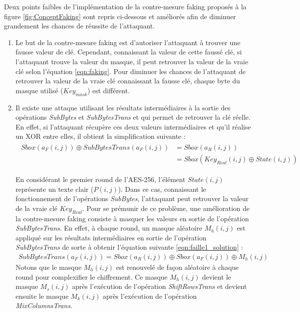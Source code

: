 \documentclass[oneside]{book}
\begin{document}
Deux points faibles \cite{lumbiarres-lopez_faking_2018} de l'implémentation de la contre-mesure faking proposés à la figure \ref{fig:ConceptFaking} sont repris ci-dessous et améliorés afin de diminuer grandement les chances de réussite de l'attaquant.
\begin{enumerate}
\item Le but de la contre-mesure faking est d'autoriser l'attaquant à trouver une fausse valeur de clé. Cependant, connaissant la valeur de cette faussé clé, si l'attaquant trouve la valeur du masque, il peut retrouver la valeur de la vraie clé selon l'équation \ref{eqn:faking}. Pour diminuer les chances de l'attaquant de retrouver la valeur de la vraie clé connaissant la fausse clé, chaque byte du masque utilisé ($Key_{mask}$) est différent.
\item Il existe une attaque utilisant les résultats intermédiaires à la sortie des opérations \textit{SubBytes} et \textit{SubBytesTrans} et qui permet de retrouver la clé réelle. En effet, si l'attaquant récupère ces deux valeurs intermédiaires et qu'il réalise un XOR entre elles, il obtient la simplification suivante : 
\begin{gather}
\begin{align*}
        Sbox(a_{F}(i,j)) \oplus SubBytesTrans(a_{F}(i,j)) &= Sbox(a_{R}(i,j))  \\
            &=Sbox(Key_{Real}(i,j) \oplus State(i,j))  
\end{align*}
\label{eqn:faille1}
\end{gather}

En considérant le premier round de l'AES-256, l'élément $State(i,j)$ représente un texte clair ($P(i,j)$). Dans ce cas, connaissant le fonctionnement de l'opérations \textit{SubBytes}, l'attaquant peut retrouver la valeur de la vraie clé $Key_{Real}$. Pour se prémunir de ce problème, une amélioration de la contre-mesure faking consiste à masquer les valeurs en sortie de l'opération \textit{SubBytesTrans}. En effet, à chaque round, un masque aléatoire $M_{h}(i,j)$ est appliqué sur les résultats intermédiaires en sortie de l'opération \textit{SubBytesTrans} de sorte à obtenir l'équation suivante \ref{eqn:faille1_solution} : 
\begin{gather}
	SubBytesTrans(a_{F}(i,j)) = Sbox(a_{R}(i,j))  \oplus Sbox(a_{F}(i,j)) \oplus M_{h}(i,j) \label{eqn:faille1_solution}
\end{gather}
Notons que le masque $M_{h}(i,j)$ est renouvelé de façon aléatoire à chaque round pour complexifier le chiffrement. Ce masque $M_{h}(i,j)$ devient le masque $M_{s}(i,j)$ après l'exécution de l'opération \textit{ShiftRowsTrans} et devient ensuite le masque $M_{k}(i,j)$ après l'exécution de l'opération \textit{MixColumnsTrans}.
\end{enumerate}
\end{document}
